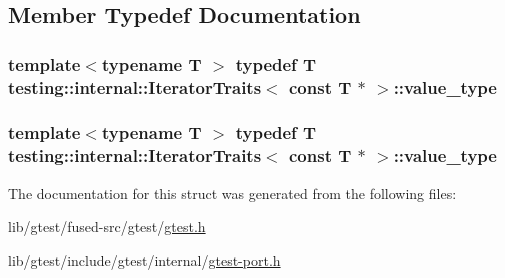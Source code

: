 \subsection{Member Typedef Documentation}
\hypertarget{structtesting_1_1internal_1_1_iterator_traits_3_01const_01_t_01_5_01_4_ae7c8867223e106f374b56a7dc4a85547}{
\subsubsection[{value\-\_\-type}]{\setlength{\rightskip}{0pt plus 5cm}template$<$typename T $>$ typedef T {\bf testing\-::internal\-::\-Iterator\-Traits}$<$ const T $\ast$ $>$\-::{\bf value\-\_\-type}}}\label{structtesting_1_1internal_1_1_iterator_traits_3_01const_01_t_01_5_01_4_ae7c8867223e106f374b56a7dc4a85547}
\hypertarget{structtesting_1_1internal_1_1_iterator_traits_3_01const_01_t_01_5_01_4_ae7c8867223e106f374b56a7dc4a85547}{
\subsubsection[{value\-\_\-type}]{\setlength{\rightskip}{0pt plus 5cm}template$<$typename T $>$ typedef T {\bf testing\-::internal\-::\-Iterator\-Traits}$<$ const T $\ast$ $>$\-::{\bf value\-\_\-type}}}\label{structtesting_1_1internal_1_1_iterator_traits_3_01const_01_t_01_5_01_4_ae7c8867223e106f374b56a7dc4a85547}


The documentation for this struct was generated from the following files\-:\begin{DoxyCompactItemize}
\item 
lib/gtest/fused-\/src/gtest/\hyperlink{fused-src_2gtest_2gtest_8h}{gtest.\-h}\item 
lib/gtest/include/gtest/internal/\hyperlink{gtest-port_8h}{gtest-\/port.\-h}\end{DoxyCompactItemize}
